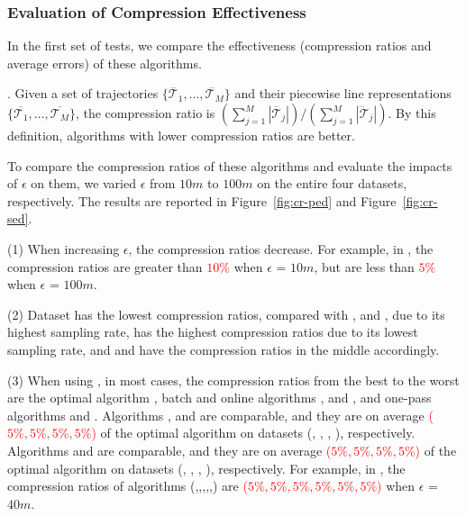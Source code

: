 \subsubsection{Evaluation of Compression Effectiveness}

In the first set of tests, we compare the effectiveness (compression ratios and average errors) of these algorithms.%

. Given a set of trajectories $\{\dddot{\mathcal{T}_1}, \ldots, \dddot{\mathcal{T}_M}\}$ and their piecewise line representations $\{\overline{\mathcal{T}_1}, \ldots, \overline{\mathcal{T}_M}\}$,
the compression ratio is $(\sum_{j=1}^{M} |\overline{\mathcal{T}}_j |)/(\sum_{j=1}^{M} |\dddot{\mathcal{T}}_j |)$.
By this definition, algorithms with lower compression ratios are better.

To compare the compression ratios of these algorithms and evaluate the impacts of $\epsilon$ on them, we varied $\epsilon$ from $10m$ to $100m$ on the entire four datasets, respectively.
The results are reported in Figure~\ref{fig:cr-ped} and Figure~\ref{fig:cr-sed}.


\sstab (1) When increasing $\epsilon$, the compression ratios decrease. For example, in \mopsi,
the compression ratios are greater than \textcolor{red}{$10\%$} when $\epsilon$ = $10m$, but are less than \textcolor{red}{$5\%$} when $\epsilon$ = $100m$.

\sstab (2) Dataset \act has the lowest compression ratios, compared with \ucar, \geolife and \mopsi, due to its highest sampling rate, \ucar has the highest compression ratios due to its lowest sampling rate, and \geolife and \mopsi have the compression ratios in the middle accordingly.

\sstab (3) When using \ped, in most cases, the compression ratios from the best to the worst are the optimal algorithm \optp, batch and online algorithms \tpa, \dpa and \bqsa, and one-pass algorithms \siped and \operb. Algorithms \tpa, \dpa and \bqsa are comparable, and they are on average \textcolor{red}{($5\%,5\%,5\%,5\%$)} of the optimal algorithm \optp on datasets (\ucar, \geolife, \mopsi, \act), respectively. Algorithms \siped and \operb are comparable, and they are on average \textcolor{red}{($5\%,5\%,5\%,5\%$)} of the optimal algorithm \optp on datasets (\ucar, \geolife, \mopsi, \act), respectively.
For example, in \mopsi, the compression ratios of algorithms (\optp,\tpa,\dpa,\bqsa,\siped,\operb ) are \textcolor{red}{($5\%, 5\%,5\%,5\%,5\%,5\%$)} when $\epsilon$ = $40m$.

